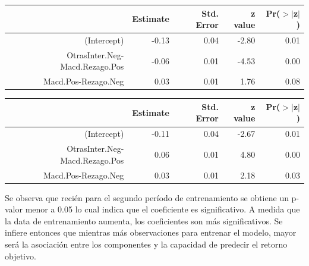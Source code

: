 \documentclass[a4paper,12pt]{Latex/Classes/PhDthesisPSnPDF}
\begin{document}
\begin{center}
\begin{table}[ht]
\centering
\begin{tabular}{rrrrr}
  \hline
 & Estimate & Std. Error & z value & Pr($>$$|$z$|$) \\ 
  \hline
(Intercept) & -0.13 & 0.04 & -2.80 & 0.01 \\ 
  OtrasInter.Neg-Macd.Rezago.Pos & -0.06 & 0.01 & -4.53 & 0.00 \\ 
  Macd.Pos-Rezago.Neg & 0.03 & 0.01 & 1.76 & 0.08 \\ 
   \hline
\end{tabular}
\end{table}\end{center}

\begin{center}
\begin{table}[ht]
\centering
\begin{tabular}{rrrrr}
  \hline
 & Estimate & Std. Error & z value & Pr($>$$|$z$|$) \\ 
  \hline
(Intercept) & -0.11 & 0.04 & -2.67 & 0.01 \\ 
  OtrasInter.Neg-Macd.Rezago.Pos & 0.06 & 0.01 & 4.80 & 0.00 \\ 
  Macd.Pos-Rezago.Neg & 0.03 & 0.01 & 2.18 & 0.03 \\ 
   \hline
\end{tabular}
\end{table}\end{center}



Se observa que recién para el segundo período de entrenamiento se obtiene un p-valor menor a 0.05 lo cual indica que el coeficiente es significativo. A medida que la data de entrenamiento aumenta, los coeficientes son más significativos. Se infiere entonces que mientras más observaciones para entrenar el modelo, mayor será la asociación entre los componentes y la capacidad de predecir el retorno objetivo.
\end{document}
